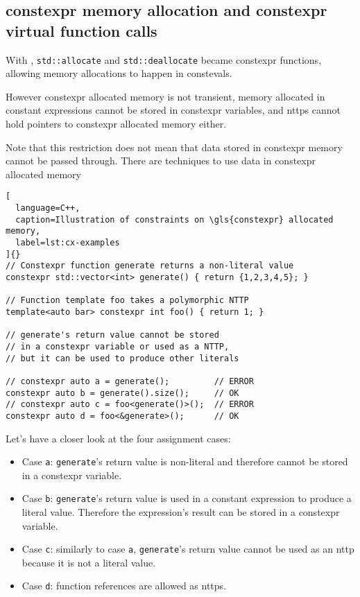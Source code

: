 \documentclass[../main]{subfiles}
\begin{document}
\subsection{
  \gls{constexpr} memory allocation and \gls{constexpr} virtual function calls
}

With , \lstinline{std::allocate} and \lstinline{std::deallocate}
became \gls{constexpr} functions, allowing memory allocations to happen in
\glspl{consteval}.

However \gls{constexpr} allocated memory is not transient, \ie memory allocated in
constant expressions cannot be stored in \gls{constexpr} variables, and \glspl{nttp}
cannot hold pointers to \gls{constexpr} allocated memory either.

Note that this restriction does not mean that data stored in \gls{constexpr} memory
cannot be passed through. There are techniques to use data in \gls{constexpr}
allocated memory

\begin{lstlisting}[
  language=C++,
  caption=Illustration of constraints on \gls{constexpr} allocated memory,
  label=lst:cx-examples
]{}
// Constexpr function generate returns a non-literal value
constexpr std::vector<int> generate() { return {1,2,3,4,5}; }

// Function template foo takes a polymorphic NTTP
template<auto bar> constexpr int foo() { return 1; }

// generate's return value cannot be stored
// in a constexpr variable or used as a NTTP,
// but it can be used to produce other literals

// constexpr auto a = generate();         // ERROR
constexpr auto b = generate().size();     // OK
// constexpr auto c = foo<generate()>();  // ERROR
constexpr auto d = foo<&generate>();      // OK
\end{lstlisting}

\clearpage%

Let's have a closer look at the four assignment cases:

\begin{itemize}
\item Case \lstinline{a}: \lstinline{generate}'s return value is non-literal
      and therefore cannot be stored in a \gls{constexpr} variable.
\item Case \lstinline{b}: \lstinline{generate}'s return value is used in a
      constant expression to produce a literal value.
      Therefore the expression's result can be stored in a \gls{constexpr} variable.
\item Case \lstinline{c}: similarly to case \lstinline{a},
      \lstinline{generate}'s return value cannot be used as an \gls{nttp} because it
      is not a literal value.
\item Case \lstinline{d}: function references are allowed as \glspl{nttp}.
\end{itemize}
\end{document}
